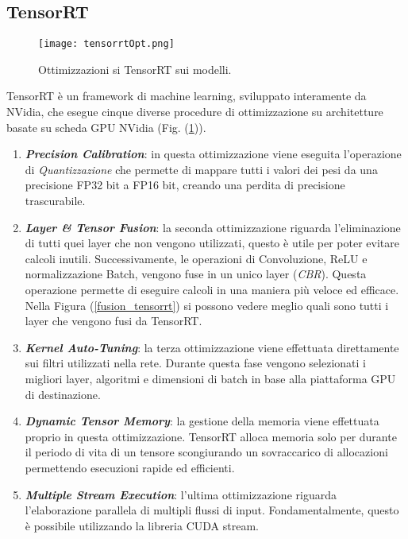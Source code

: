 \subsection{TensorRT}
\begin{figure}
    \centering
    \texttt{[image: tensorrtOpt.png]}
    \centering
    \caption{Ottimizzazioni si TensorRT sui modelli.}
    \label{tensorrt}
\end{figure}
TensorRT è un framework di machine learning, sviluppato interamente da 
NVidia, che esegue cinque diverse procedure di ottimizzazione su architetture 
basate su scheda GPU NVidia (Fig. (\ref{tensorrt})). 
\begin{enumerate}
    \item {\bfseries{\emph{Precision Calibration}}}: in questa ottimizzazione viene eseguita 
    l'operazione di \emph{Quantizzazione} che permette di mappare tutti i valori 
    dei pesi da una precisione FP32 bit a FP16 bit, creando una perdita 
    di precisione trascurabile.
    \item {\bfseries{\emph{Layer \& Tensor Fusion}}}: la seconda ottimizzazione riguarda l'eliminazione 
    di tutti quei layer che non vengono utilizzati, questo è 
    utile per poter evitare calcoli inutili. Successivamente, le operazioni 
    di Convoluzione, ReLU e normalizzazione Batch, vengono fuse in un 
    unico layer (\emph{CBR}). Questa operazione permette di eseguire calcoli 
    in una maniera più veloce ed efficace. Nella Figura (\ref{fusion_tensorrt}) si possono 
    vedere meglio quali sono tutti i layer che vengono fusi da TensorRT.
    \item {\bfseries{\emph{Kernel Auto-Tuning}}}: la terza ottimizzazione viene effettuata direttamente 
    sui filtri utilizzati nella rete. Durante questa fase vengono 
    selezionati i migliori layer, algoritmi e dimensioni di batch in base alla 
    piattaforma GPU di destinazione.
    \item {\bfseries{\emph{Dynamic Tensor Memory}}}: la gestione della memoria viene effettuata 
    proprio in questa ottimizzazione. TensorRT alloca memoria 
    solo per durante il periodo di vita di un tensore scongiurando un 
    sovraccarico di allocazioni permettendo esecuzioni rapide ed efficienti.
    \item {\bfseries{\emph{Multiple Stream Execution}}}: l'ultima ottimizzazione riguarda l'elaborazione 
    parallela di multipli flussi di input. Fondamentalmente, 
    questo è possibile utilizzando la libreria CUDA stream.
\end{enumerate}
